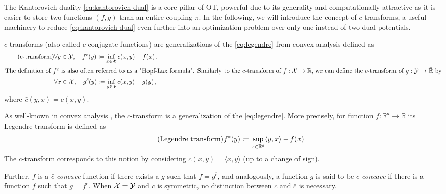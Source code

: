 The Kantorovich duality \eqref{eq:kantorovich-dual} is a core pillar of \acrlong{OT}, powerful due to its generality and computationally attractive as it is easier to store two functions $(f, g)$ than an entire coupling $\pi$.
In the following, we will introduce the concept of $c$-transforms, a useful machinery to reduce \eqref{eq:kantorovich-dual} even further into an optimization problem over only one instead of two dual potentials.
\begin{definition}[$c$-transform] \label{eq:c-transform} 
	$c$-transforms (also called $c$-conjugate functions) are generalizations of the \ref{eq:legendre} from convex analysis defined as
\begin{align*} \tag{c-transform}
	& \forall y \in {\mathcal{Y}}, \quad f^c(y) \coloneqq \inf _{x \in {\mathcal{X}}} c(x, y)-f(x) \,.\\
	\intertext{The definition of $f^c$ is also often referred to as a "Hopf-Lax formula". Similarly to the $c$-transform of $f : {\mathcal{X}} \rightarrow \mathbb{R}$, we can define the $\bar{c}$-transform of $g : {\mathcal{Y}} \rightarrow \bar{\mathbb{R}}$ by}
	& \forall x \in {\mathcal{X}}, \quad g^{\bar{c}}(y) \coloneqq \inf _{y \in {\mathcal{Y}}} c(x, y)-g(y) \,,
\end{align*}
where $\bar{c}(y, x) = c(x, y)$. 
\end{definition}
\begin{remark}
	As well-known in convex analysis \citep{rockafellar1970conjugate}, the $c$-transform is a generalization of the \ref{eq:legendre}. More precisely, for function $f : \mathbb{R}^d \rightarrow \mathbb{R}$ its Legendre transform is defined as 
	\begin{equation} \label{eq:legendre}
	\tag{Legendre transform}
		f^*(y) \coloneqq \sup_{x \in \mathbb{R}^d} \langle y, x \rangle - f(x)
	\end{equation}
	The $c$-transform corresponds to this notion by considering $c(x, y) = \langle x, y \rangle$ (up to a change of sign).
\end{remark}
Further, $f$ is a \textit{$\bar{c}$-concave} function if there exists a $g$ such that $f = g^{\bar{c}}$, and analogously, a function $g$ is said to be \textit{$c$-concave} if there is a function $f$ such that $g = f^c$.
When ${\mathcal{X}} = {\mathcal{Y}}$ and $c$ is symmetric, no distinction between $c$ and $\bar{c}$ is necessary.

